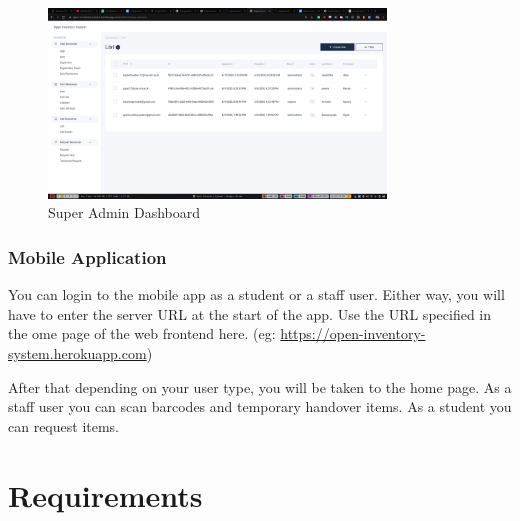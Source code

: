 \documentclass[12pt,a4paper]{article}
\begin{document}
\begin{figure}[ht]
    \centering
    \includegraphics[width=0.8\textwidth]{./images/2.png}
    \caption{Super Admin Dashboard}
    \label{fig2}
\end{figure}

\subsubsection{Mobile Application}

You can login to the mobile app as a student or a staff user. Either way, you will have to enter the server URL at the start of the app. Use the URL specified in the ome page of the web frontend here. (eg: \url{https://open-inventory-system.herokuapp.com})

After that depending on your user type, you will be taken to the home page. As a staff user you can scan barcodes and temporary handover items. As a student you can request items.


\section{Requirements}
\end{document}
